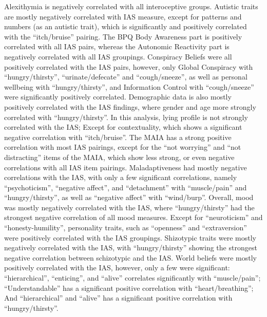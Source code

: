 \documentclass[
  man,
  floatsintext,
  longtable,
  nolmodern,
  notxfonts,
  notimes,
  colorlinks=true,linkcolor=blue,citecolor=blue,urlcolor=blue]{apa7}
\begin{document}
Alexithymia is negatively correlated with all interoceptive groups.
Autistic traits are mostly negatively correlated with IAS measure,
except for patterns and numbers (as an autistic trait), which is
significantly and positively correlated with the ``itch/bruise''
pairing. The BPQ Body Awareness part is positively correlated with all
IAS pairs, whereas the Autonomic Reactivity part is negatively
correlated with all IAS groupings. Conspiracy Beliefs were all
positively correlated with the IAS pairs, however, only Global
Conspiracy with ``hungry/thirsty'', ``urinate/defecate'' and
``cough/sneeze'', as well as personal wellbeing with ``hungry/thirsty'',
and Information Control with ``cough/sneeze'' were significantly
positively correlated. Demographic data is also mostly positively
correlated with the IAS findings, where gender and age more strongly
correlated with ``hungry/thirsty''. In this analysis, lying profile is
not strongly correlated with the IAS; Except for contextuality, which
shows a significant negative correlation with ``itch/bruise''. The MAIA
has a strong positive correlation with most IAS pairings, except for the
``not worrying'' and ``not distracting'' items of the MAIA, which show
less strong, or even negative correlations with all IAS item pairings.
Maladaptiveness had mostly negative correlations with the IAS, with only
a few significant correlations, namely ``psychoticism'', ``negative
affect'', and ``detachment'' with ``muscle/pain'' and
``hungry/thirsty'', as well as ``negative affect'' with ``wind/burp''.
Overall, mood was mostly negatively correlated with the IAS, where
``hungry/thirsty'' had the strongest negative correlation of all mood
measures. Except for ``neuroticism'' and ``honesty-humility'',
personality traits, such as ``openness'' and ``extraversion'' were
positively correlated with the IAS groupings. Shizotypic traits were
mostly negatively correlated with the IAS, with ``hungry/thirsty''
showing the strongest negative correlation between schizotypic and the
IAS. World beliefs were mostly positively correlated with the IAS,
however, only a few were significant: ``hierarchical'', ``enticing'',
and ``alive'' correlates significantly with ``muscle/pain'';
``Understandable'' has a significant positive correlation with
``heart/breathing''; And ``hierarchical'' and ``alive'' has a
significant positive correlation with ``hungry/thirsty''.
\end{document}
